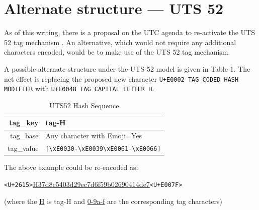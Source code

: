 \documentclass[12pt]{article}
\begin{document}

%

\clearpage

\section{Alternate structure — UTS 52}

As of this writing, there is a proposal on the UTC agenda to re-activate the UTS 52 tag mechanism \autocite{L216226}.
An alternative, which would not require any additional characters encoded, would be to make use of the UTS 52 tag mechanism.

A possible alternate structure under the UTS 52 model is given in Table 1.
The net effect is replacing the proposed new character \texttt{U+E0002 TAG CODED HASH MODIFIER} with \texttt{U+E0048 TAG CAPITAL LETTER H}.



\begin{table}[]
\centering
\caption{UTS52 Hash Sequence}
\begin{tabular}{| r | l |}
\hline
	tag\_key	&	tag-H \\
\hline
	tag\_base	&	Any character with Emoji=Yes \\
\hline
	tag\_value	&	\texttt{[\textbackslash{}x{E0030}-\textbackslash{}x{E0039}\textbackslash{}x{E0061}-\textbackslash{}x{E0066}]\+}  \\
\hline
	
\end{tabular}
\end{table}

The above example could be re-encoded as:
	
\texttt{<U+2615>}\underline{H37d8c5403d29ec7d6f59b02690414de7}\texttt{<U+E007F>}

(where the \underline{H} is tag-H  and \underline{0-9a-f} are the corresponding tag characters)
\end{document}

